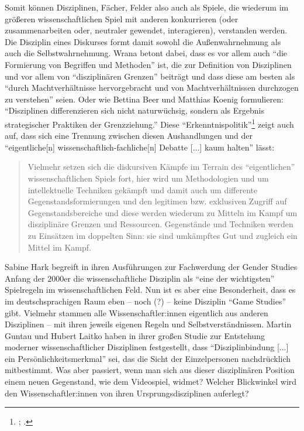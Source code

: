 \documentclass{scrartcl}
\begin{document}
Somit können Disziplinen, Fächer, Felder also auch als Spiele, die wiederum im größeren wissenschaftlichen Spiel mit anderen konkurrieren (oder zusammenarbeiten oder, neutraler gewendet, interagieren), verstanden werden.
Die Disziplin eines Diskurses formt damit sowohl die Außenwahrnehmung als auch die Selbstwahrnehmung.
Wrana betont dabei, dass es vor allem auch \enquote{die Formierung von Begriffen und Methoden} ist, die zur Definition von Disziplinen und vor allem von \enquote{disziplinären Grenzen} beiträgt und dass diese am besten als \enquote{durch Machtverhältnisse hervorgebracht und von Machtverhältnissen durchzogen zu verstehen} seien.\autocite[][S.~45]{wrana_inter-disziplinaritat_2017}
Oder wie Bettina Beer und Matthias Koenig formulieren:
\enquote{Disziplinen differenzieren sich nicht naturwüchsig, sondern als Ergebnis strategischer Praktiken der Grenzziehung.}\autocite[][S.~4]{beer_grenzziehungen_2009}
Diese \enquote{Erkenntnispolitik}\footnote{\autocite[][S.~115--121]{seitter_erkenntnispolitik_1985}; \autocite[][S.~45]{wrana_inter-disziplinaritat_2017}.} zeigt auch auf, dass sich eine Trennung zwischen diesen Aushandlungen und der \enquote{eigentliche[n] wissenschaftlich-fachliche[n] Debatte [$\ldots$] kaum halten} lässt:\autocite[][S.~49]{wrana_inter-disziplinaritat_2017}

\begin{quote}
   Vielmehr setzen sich die diskursiven Kämpfe im Terrain des \enquote{eigentlichen} wissenschaftlichen Spiels fort, hier wird um Methodologien und um intellektuelle Techniken gekämpft und damit auch um differente Gegenstandsformierungen und den legitimen bzw. exklusiven Zugriff auf Gegenstandsbereiche und diese werden wiederum zu Mitteln im Kampf um disziplinäre Grenzen und Ressourcen.
   Gegenstände und Techniken werden zu Einsätzen im doppelten Sinn: sie sind umkämpftes Gut und zugleich ein Mittel im Kampf.\autocite[][S.~49--50]{wrana_inter-disziplinaritat_2017}
\end{quote}

Sabine Hark begreift in ihren Ausführungen zur Fachwerdung der Gender Studies Anfang der $2000$er die wissenschaftliche Disziplin als \enquote{eine der wichtigsten} Spielregeln im wissenschaftlichen Feld.\autocite[][S.~96]{hark_diszipliniertes_2001}
Nun ist es aber eine Besonderheit, dass es im deutschsprachigen Raum eben -- noch (?) -- keine Disziplin \enquote{Game Studies} gibt.\autocite[Vgl.][S.~96]{rautzenberg_spielformige_2021}
Vielmehr stammen alle Wissenschaftler:innen eigentlich aus anderen Disziplinen -- mit ihren jeweils eigenen Regeln und Selbstverständnissen.
Martin Guntau und Hubert Laitko haben in ihrer großen Studie zur Entstehung moderner wissenschaftlicher Disziplinen festgestellt, dass \enquote{Disziplinbindung [$\ldots$] ein Persönlichkeitsmerkmal} sei,\autocite[][S.~12]{guntau_einleitung_2021} das die Sicht der Einzelpersonen nachdrücklich mitbestimmt.
Was aber passiert, wenn man sich aus dieser disziplinären Position einem neuen Gegenstand, wie dem Videospiel, widmet?
Welcher Blickwinkel wird den Wissenschaftler:innen von ihren Ursprungsdisziplinen auferlegt?
\end{document}
